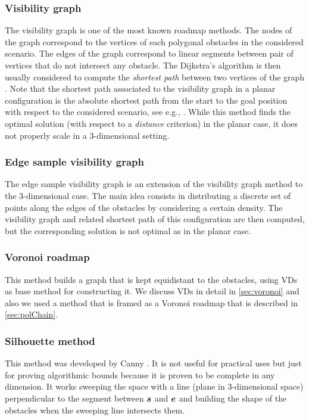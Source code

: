 \documentclass[dissertation.tex]{subfiles}
\begin{document}
\subsubsection{Visibility graph}
The visibility graph is one of the most known roadmap methods. The
nodes of the graph correspond to the vertices of each polygonal
obstacles in the considered scenario. The edges of the graph
correspond to linear segments between pair of vertices that do not
intersect any obstacle. The Dijkstra's algorithm is then usually
considered to compute the \emph{shortest path} between two vertices of
the graph \cite{dijkstra}.  Note
that the shortest path associated to the visibility graph in a planar
configuration is the absolute shortest path from the start to the goal
position with respect to the considered scenario, see e.g.,
\cite{deberg}. While this method finds the optimal solution (with respect to a
\emph{distance} criterion) in the planar case, it does not properly
scale in a 3-dimensional setting.

\subsubsection{Edge sample visibility graph}
The edge sample visibility graph is an extension of the visibility
graph method to the 3-dimensional case. The main idea consists in
distributing a discrete set of points along the edges of the obstacles
by considering  a certain density. The visibility graph and related
shortest path of this configuration are then computed, but the
corresponding solution is not optimal as in the planar case.

\subsubsection{Voronoi roadmap}
This method builds a graph that is kept equidistant to the obstacles,
using
\acp{VD} as base method for constructing it. We discuss \acp{VD}
in detail in \cref{sec:voronoi} and also we used a method that is
framed as a Voronoi roadmap that is described in \cref{sec:polChain}.

\subsubsection{Silhouette method}
This method was developed by Canny \cite{canny}. It is not useful for
practical uses but just for
proving algorithmic bounds because it is proven to be complete in any
dimension. It works sweeping the space with a line (plane in
3-dimensional space) perpendicular to the
segment between $\boldsymbol{s}$ and $\boldsymbol{e}$ and building the shape of the
obstacles when the sweeping line intersects them.
\end{document}
